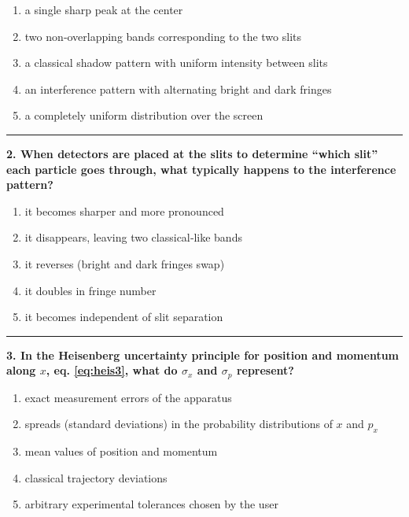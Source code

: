 \documentclass[
  english,
  9pt,
]{extbook}
\providecommand{\tightlist}{%
  \setlength{\itemsep}{0pt}\setlength{\parskip}{0pt}}
\theoremstyle{definition}
\theoremstyle{definition}
\theoremstyle{definition}
\theoremstyle{definition}
\theoremstyle{remark}
\begin{document}
\begin{enumerate}
\def\labelenumi{\alph{enumi}.}
\tightlist
\item
  a single sharp peak at the center\\
\item
  two non‑overlapping bands corresponding to the two slits\\
\item
  a classical shadow pattern with uniform intensity between slits\\
\item
  an interference pattern with alternating bright and dark fringes\\
\item
  a completely uniform distribution over the screen
\end{enumerate}

\begin{center}\rule{0.5\linewidth}{0.5pt}\end{center}

\textbf{2. When detectors are placed at the slits to determine ``which slit'' each particle goes through, what typically happens to the interference pattern?}

\begin{enumerate}
\def\labelenumi{\alph{enumi}.}
\tightlist
\item
  it becomes sharper and more pronounced\\
\item
  it disappears, leaving two classical‑like bands\\
\item
  it reverses (bright and dark fringes swap)\\
\item
  it doubles in fringe number\\
\item
  it becomes independent of slit separation
\end{enumerate}

\begin{center}\rule{0.5\linewidth}{0.5pt}\end{center}

\textbf{3. In the Heisenberg uncertainty principle for position and momentum along \(x\), eq. \eqref{eq:heis3}, what do \(\sigma_x\) and \(\sigma_p\) represent?}

\begin{enumerate}
\def\labelenumi{\alph{enumi}.}
\tightlist
\item
  exact measurement errors of the apparatus\\
\item
  spreads (standard deviations) in the probability distributions of \(x\) and \(p_x\)\\
\item
  mean values of position and momentum\\
\item
  classical trajectory deviations\\
\item
  arbitrary experimental tolerances chosen by the user
\end{enumerate}
\end{document}
